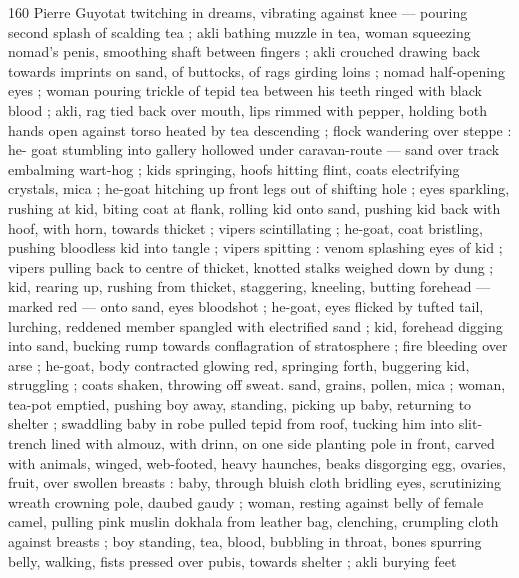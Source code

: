 160 Pierre Guyotat
twitching in dreams, vibrating against knee — pouring second splash
of scalding tea ; akli bathing muzzle in tea, woman squeezing
nomad’s penis, smoothing shaft between fingers ; akli crouched
drawing back towards imprints on sand, of buttocks, of rags girding
loins ; nomad half-opening eyes ; woman pouring trickle of tepid tea
between his teeth ringed with black blood ; akli, rag tied back over
mouth, lips rimmed with pepper, holding both hands open against
torso heated by tea descending ; flock wandering over steppe : he-
goat stumbling into gallery hollowed under caravan-route — sand
over track embalming wart-hog ; kids springing, hoofs hitting flint,
coats electrifying crystals, mica ; he-goat hitching up front legs out
of shifting hole ; eyes sparkling, rushing at kid, biting coat at flank,
rolling kid onto sand, pushing kid back with hoof, with horn, towards
thicket ; vipers scintillating ; he-goat, coat bristling, pushing
bloodless kid into tangle ; vipers spitting : venom splashing eyes of
kid ; vipers pulling back to centre of thicket, knotted stalks weighed
down by dung ; kid, rearing up, rushing from thicket, staggering,
kneeling, butting forehead — marked red — onto sand, eyes
bloodshot ; he-goat, eyes flicked by tufted tail, lurching, reddened
member spangled with electrified sand ; kid, forehead digging into
sand, bucking rump towards conflagration of stratosphere ; fire
bleeding over arse ; he-goat, body contracted glowing red, springing
forth, buggering kid, struggling ; coats shaken, throwing off sweat.
sand, grains, pollen, mica ; woman, tea-pot emptied, pushing boy
away, standing, picking up baby, returning to shelter ; swaddling
baby in robe pulled tepid from roof, tucking him into slit-trench lined
with almouz, with drinn, on one side planting pole in front, carved
with animals, winged, web-footed, heavy haunches, beaks disgorging
egg, ovaries, fruit, over swollen breasts : baby, through bluish cloth
bridling eyes, scrutinizing wreath crowning pole, daubed gaudy ;
woman, resting against belly of female camel, pulling pink muslin
dokhala from leather bag, clenching, crumpling cloth against breasts
; boy standing, tea, blood, bubbling in throat, bones spurring belly,
walking, fists pressed over pubis, towards shelter ; akli burying feet


